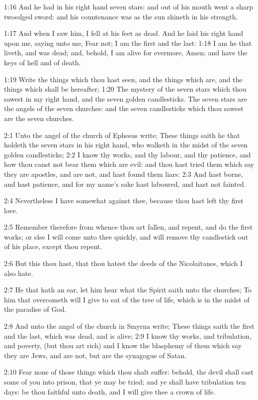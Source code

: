 1:16 And he had in his right hand seven stars: and out of his mouth
went a sharp twoedged sword: and his countenance was as the sun
shineth in his strength.

1:17 And when I saw him, I fell at his feet as dead. And he laid his
right hand upon me, saying unto me, Fear not; I am the first and the
last: 1:18 I am he that liveth, and was dead; and, behold, I am alive
for evermore, Amen; and have the keys of hell and of death.

1:19 Write the things which thou hast seen, and the things which are,
and the things which shall be hereafter; 1:20 The mystery of the seven
stars which thou sawest in my right hand, and the seven golden
candlesticks. The seven stars are the angels of the seven churches:
and the seven candlesticks which thou sawest are the seven churches.

2:1 Unto the angel of the church of Ephesus write; These things saith
he that holdeth the seven stars in his right hand, who walketh in the
midst of the seven golden candlesticks; 2:2 I know thy works, and thy
labour, and thy patience, and how thou canst not bear them which are
evil: and thou hast tried them which say they are apostles, and are
not, and hast found them liars: 2:3 And hast borne, and hast patience,
and for my name's sake hast laboured, and hast not fainted.

2:4 Nevertheless I have somewhat against thee, because thou hast left
thy first love.

2:5 Remember therefore from whence thou art fallen, and repent, and do
the first works; or else I will come unto thee quickly, and will
remove thy candlestick out of his place, except thou repent.

2:6 But this thou hast, that thou hatest the deeds of the
Nicolaitanes, which I also hate.

2:7 He that hath an ear, let him hear what the Spirit saith unto the
churches; To him that overcometh will I give to eat of the tree of
life, which is in the midst of the paradise of God.

2:8 And unto the angel of the church in Smyrna write; These things
saith the first and the last, which was dead, and is alive; 2:9 I know
thy works, and tribulation, and poverty, (but thou art rich) and I
know the blasphemy of them which say they are Jews, and are not, but
are the synagogue of Satan.

2:10 Fear none of those things which thou shalt suffer: behold, the
devil shall cast some of you into prison, that ye may be tried; and ye
shall have tribulation ten days: be thou faithful unto death, and I
will give thee a crown of life.

